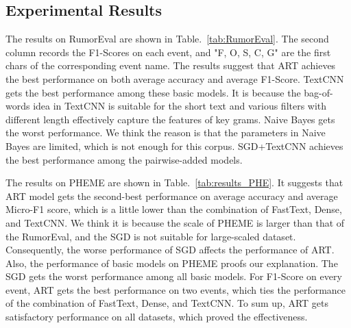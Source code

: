 \begin{table}[htbp]
	\caption{RumorEval}
	\centering
	\label{tab:RumorEval}
\end{table}


\subsection{Experimental Results}
The results on RumorEval are shown in Table.~{\ref{tab:RumorEval}}. The second column records the F1-Scores on each event, and "F, O, S, C, G" are the first chars of the corresponding event name. The results suggest that ART achieves the best performance on both average accuracy and average F1-Score. TextCNN gets the best performance among these basic models. It is because the bag-of-words idea in TextCNN is suitable for the short text and various filters with different length effectively capture the features of key grams. Naive Bayes gets the worst performance. We think the reason is that the parameters in Naive Bayes are limited, which is not enough for this corpus. SGD+TextCNN achieves the best performance among the pairwise-added models. 

The results on PHEME are shown in Table.~\ref{tab:results_PHE}. It suggests that ART model gets the second-best performance on average accuracy and average Micro-F1 score, which is a little lower than the combination of FastText, Dense, and TextCNN. We think it is because the scale of PHEME is larger than that of the RumorEval, and the SGD is not suitable for large-scaled dataset. Consequently, the worse performance of SGD affects the performance of ART. Also, the performance of basic models on PHEME proofs our explanation. The SGD gets the worst performance among all basic models. For F1-Score on every event, ART gets the best performance on two events, which ties the performance of the combination of FastText, Dense, and TextCNN. To sum up, ART gets satisfactory performance on all datasets, which proved
the effectiveness.

